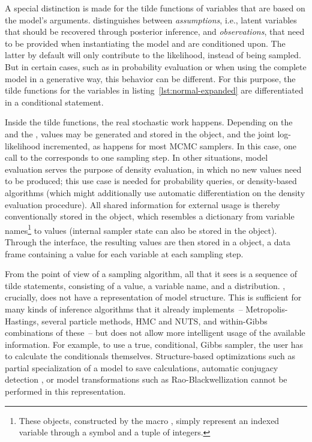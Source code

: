 A special distinction is made for the tilde functions of variables that are based on the model's
arguments. \dppljl{} distinguishes between \emph{assumptions}, i.e., latent variables that should be
recovered through posterior inference, and \emph{observations}, that need to be provided when
instantiating the model and are conditioned upon.  The latter by default will only contribute to the
likelihood, instead of being sampled.  But in certain cases, such as in probability evaluation or
when using the complete model in a generative way, this behavior can be different.  For this
purpose, the tilde functions for the variables  in listing~\ref{lst:normal-expanded} are
differentiated in a conditional statement.

Inside the tilde functions, the real stochastic work happens.  Depending on the  and
the , values may be generated and stored in the  object, and the joint
log-likelihood incremented, as happens for most MCMC samplers.  In this case, one call to the
 corresponds to one sampling step.  In other situations, model evaluation serves
the purpose of density evaluation, in which no new values need to be produced; this use case is
needed for probability queries, or density-based algorithms (which might additionally use automatic
differentiation on the density evaluation procedure).  All shared information for external usage is
thereby conventionally stored in the  object, which resembles a dictionary from
variable names\footnote{These  objects, constructed by the macro ,
  simply represent an indexed variable through a symbol and a tuple of integers.}  to values
(internal sampler state can also be stored in the  object).  Through the
 interface, the resulting values are then stored in a  object, a data
frame containing a value for each variable at each sampling step.

From the point of view of a sampling algorithm, all that it sees is a sequence of tilde statements,
consisting of a value, a variable name, and a distribution.  \turingjl{}, crucially, does not have a
representation of model structure.  This is sufficient for many kinds of inference algorithms that
it already implements~-- Metropolis-Hastings, several particle methods, HMC and NUTS, and
within-Gibbs combinations of these~-- but does not allow more intelligent usage of the available
information.  For example, to use a true, conditional, Gibbs sampler, the user has to calculate the
conditionals themselves.  Structure-based optimizations such as partial specialization of a model to
save calculations, automatic conjugacy detection \parencite{hoffman2018autoconj}, or model
transformations such as Rao-Blackwellization \parencite{murray2017delayed} cannot be performed in
this representation.


